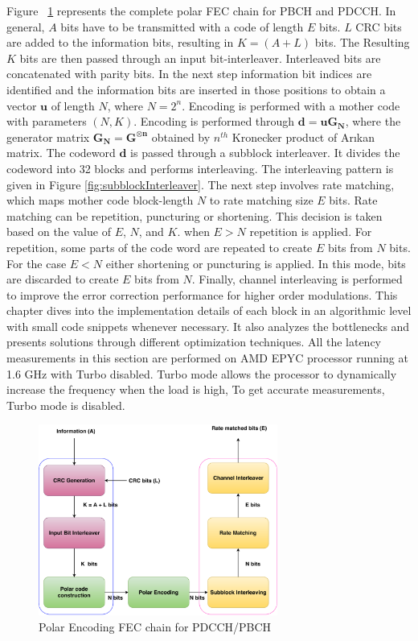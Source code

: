 Figure ~\ref{fig:5g_txfec_chain} represents the complete polar FEC chain for PBCH and PDCCH. In general, $A$ bits have to be transmitted with a code of length $E$ bits. $L$ CRC bits are added to the information bits, resulting in  $K = (A + L)$ bits. The Resulting $K$ bits are then passed through an input bit-interleaver. Interleaved bits are concatenated with parity bits. In the next step information bit indices are identified and the information bits are inserted in those positions to obtain a vector $\boldsymbol{u}$ of length $N$, where $N = 2^{n}$. Encoding is performed with a mother code with parameters $(N, K)$. Encoding is performed through $\boldsymbol{d = uG_{N}}$, where the generator matrix $\boldsymbol{G_{N} = G^{\otimes n}}$ obtained by $n^{th}$ Kronecker product of Ar\i kan matrix. The codeword $\boldsymbol{d}$ is passed through a subblock interleaver. It divides the codeword into 32 blocks and performs interleaving. The interleaving pattern is given in Figure \ref{fig:subblockInterleaver}. The next step involves rate matching, which maps mother code block-length $N$ to rate matching size $E$ bits. Rate matching can be repetition, puncturing or shortening.  This decision is taken based on the value of $E$, $N$, and $K$. when $E > N$ repetition is applied. For repetition, some parts of the code word are repeated to create $E$ bits from $N$ bits. For the case $E < N$ either shortening or puncturing is applied. In this mode, bits are discarded to create $E$ bits from $N$. Finally, channel interleaving is performed to improve the error correction performance for higher order modulations. This chapter dives into the implementation details of each block in an algorithmic level with small code snippets whenever necessary. It also analyzes the bottlenecks and presents solutions through different optimization techniques. All the latency measurements in this section are performed on AMD EPYC processor running at 1.6 GHz with Turbo disabled. Turbo mode allows the processor to dynamically increase the frequency when the load is high, To get accurate measurements, Turbo mode is disabled.


\begin{figure}[h]
	\centering
	\includegraphics[width=0.7\textwidth]{./figures/5GFECChain.pdf}
	\caption{Polar Encoding FEC chain for PDCCH/PBCH}
	\label{fig:5g_txfec_chain}
\end{figure}


